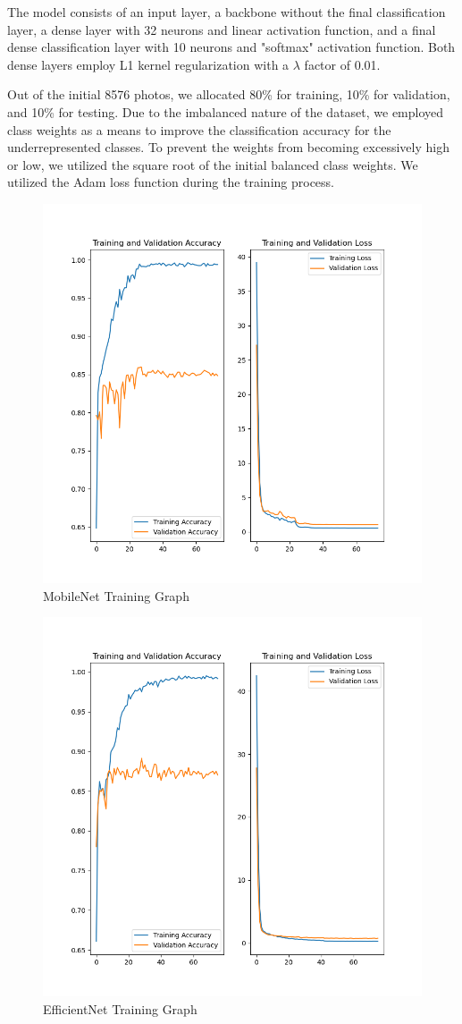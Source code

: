 The model consists of an input layer, a backbone without the final classification layer, a dense layer with 32 neurons and linear activation function, and a final dense classification layer with 10 neurons and "softmax" activation function. Both dense layers employ L1 kernel regularization with a $\lambda$ factor of 0.01.

Out of the initial 8576 photos, we allocated 80\% for training, 10\% for validation, and 10\% for testing. Due to the imbalanced nature of the dataset, we employed class weights as a means to improve the classification accuracy for the underrepresented classes. To prevent the weights from becoming excessively high or low, we utilized the square root of the initial balanced class weights. We utilized the Adam loss function during the training process.


\begin{figure}[h!]
    \centering
    \includegraphics[width = .6\linewidth]{Figures/T-MNV1.png}
    \caption{MobileNet Training Graph}
    \label{fig:MNT}
\end{figure}

\begin{figure}[h!]
    \centering
    \includegraphics[width = .6\linewidth]{Figures/T-ENV2B0.png}
    \caption{EfficientNet Training Graph}
    \label{fig:ENT}
\end{figure}

